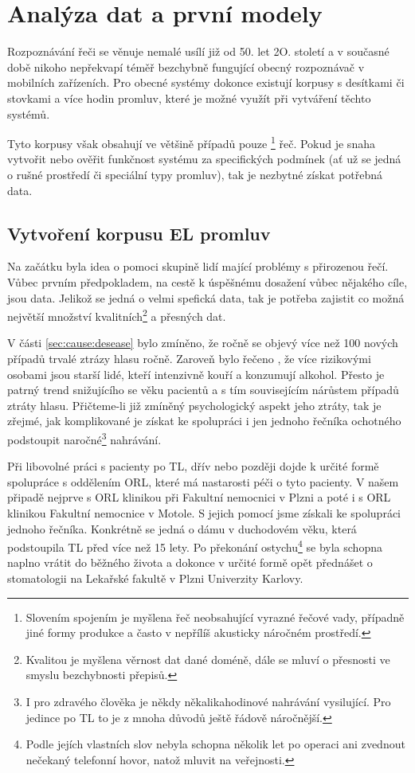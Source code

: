 \section{Analýza dat a první modely}
\label{chap:experiments:analysis}

Rozpoznávání řeči se věnuje nemalé usílí již od 50. let 2O. století a v současné době nikoho nepřekvapí téměř bezchybně fungující obecný rozpoznávač v mobilních zařízeních. Pro obecné systémy dokonce existují korpusy s desítkami či stovkami a více hodin promluv, které je možné využít při vytváření těchto systémů.

Tyto korpusy však obsahují ve většině případů pouze \footnote{Slovením spojením  je myšlena řeč neobsahující vyrazné řečové vady, případně jiné formy produkce a často v nepřílíš akusticky náročném prostředí.} řeč. Pokud je snaha vytvořit nebo ověřit funkčnost systému za specifických podmínek (ať už se jedná o rušné prostředí či speciální typy promluv), tak je nezbytné získat potřebná data.

\subsection{Vytvoření korpusu EL promluv}
\label{chap:experiments:analysis:corpus}

Na začátku byla idea o pomoci skupině lidí mající problémy s přirozenou řečí. Vůbec prvním předpokladem, na cestě k úspěšnému dosažení vůbec nějakého cíle, jsou data. Jelikož se jedná o velmi spefická data, tak je potřeba zajistit co možná největší množství kvalitních\footnote{Kvalitou je myšlena věrnost dat dané doméně, dále se mluví o přesnosti ve smyslu bezchybnosti přepisů.} a přesných dat.

V části \ref{sec:cause:desease} bylo zmíněno, že ročně se objevý více než 100 nových případů trvalé ztrázy hlasu ročně. Zaroveň bylo řečeno \cite{Skvrnakova2010}, že více rizikovými osobami jsou starší lidé, kteří intenzivně kouří a konzumují alkohol. Přesto je patrný trend snižujícího se věku pacientů a s tím souvisejícím nárůstem případů ztráty hlasu. Přičteme-li již zmíněný psychologický aspekt jeho ztráty, tak je zřejmé, jak komplikované je získat ke spolupráci i jen jednoho řečníka ochotného podstoupit naročné\footnote{I pro zdravého člověka je někdy někalikahodinové nahrávání vysilující. Pro jedince po TL to je z mnoha důvodů ještě řádově náročnější.} nahrávání.

Při libovolné práci s pacienty po TL, dřív nebo později dojde k určité formě spolupráce s oddělením ORL, které má nastarosti péči o tyto pacienty. V našem připadě nejprve s ORL klinikou při Fakultní nemocnici v Plzni a poté i s ORL klinikou Fakultní nemocnice v Motole. S jejich pomocí jsme získali ke spolupráci jednoho řečníka. Konkrétně se jedná o dámu v duchodovém věku, která podstoupila TL před více než 15 lety. Po překonání ostychu\footnote{Podle jejích vlastních slov nebyla schopna několik let po operaci ani zvednout nečekaný telefonní hovor, natož mluvit na veřejnosti.} se byla schopna naplno vrátit do běžného života a dokonce v určité formě opět přednášet o stomatologii na Lekařské fakultě v Plzni Univerzity Karlovy.

